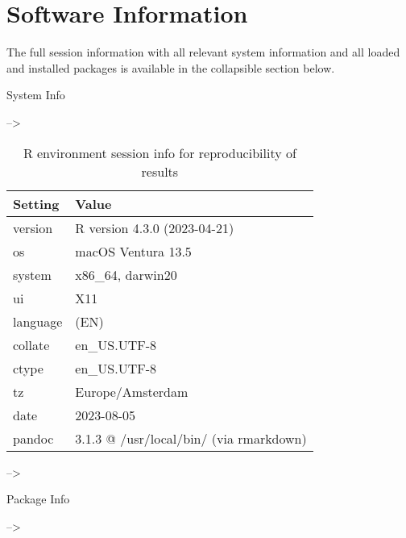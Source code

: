 \documentclass[
]{article}
\begin{document}
\hypertarget{software-information}{%
\section{Software Information}\label{software-information}}

The full session information with all relevant system information and
all loaded and installed packages is available in the collapsible
section below.

System Info

--\textgreater{}

\begin{table}

\caption{\label{tab:Reproducibility-sessionInfo-R-environment}R environment session info for reproducibility of results}
\centering
\begin{tabular}[t]{ll}
\toprule
Setting & Value\\
\midrule
version & R version 4.3.0 (2023-04-21)\\
os & macOS Ventura 13.5\\
system & x86\_64, darwin20\\
ui & X11\\
language & (EN)\\
\addlinespace
collate & en\_US.UTF-8\\
ctype & en\_US.UTF-8\\
tz & Europe/Amsterdam\\
date & 2023-08-05\\
pandoc & 3.1.3 @ /usr/local/bin/ (via rmarkdown)\\
\bottomrule
\end{tabular}
\end{table}

--\textgreater{}

Package Info

--\textgreater{}
\end{document}
